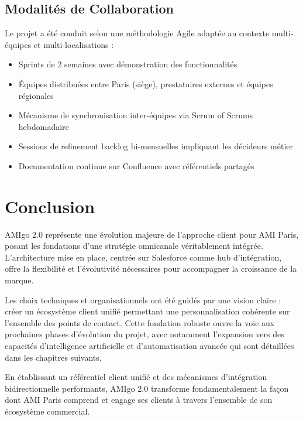 \subsection{Modalités de Collaboration}

Le projet a été conduit selon une méthodologie Agile adaptée au contexte multi-équipes et multi-localisations :

\begin{itemize}
    \item Sprints de 2 semaines avec démonstration des fonctionnalités
    \item Équipes distribuées entre Paris (siège), prestataires externes et équipes régionales
    \item Mécanisme de synchronisation inter-équipes via Scrum of Scrums hebdomadaire
    \item Sessions de refinement backlog bi-mensuelles impliquant les décideurs métier
    \item Documentation continue sur Confluence avec référentiels partagés
\end{itemize}

\section{Conclusion}

AMIgo 2.0 représente une évolution majeure de l'approche client pour AMI Paris, posant les fondations d'une stratégie omnicanale véritablement intégrée. L'architecture mise en place, centrée sur Salesforce comme hub d'intégration, offre la flexibilité et l'évolutivité nécessaires pour accompagner la croissance de la marque.

Les choix techniques et organisationnels ont été guidés par une vision claire : créer un écosystème client unifié permettant une personnalisation cohérente sur l'ensemble des points de contact. Cette fondation robuste ouvre la voie aux prochaines phases d'évolution du projet, avec notamment l'expansion vers des capacités d'intelligence artificielle et d'automatisation avancée qui sont détaillées dans les chapitres suivants.

En établissant un référentiel client unifié et des mécanismes d'intégration bidirectionnelle performants, AMIgo 2.0 transforme fondamentalement la façon dont AMI Paris comprend et engage ses clients à travers l'ensemble de son écosystème commercial.
